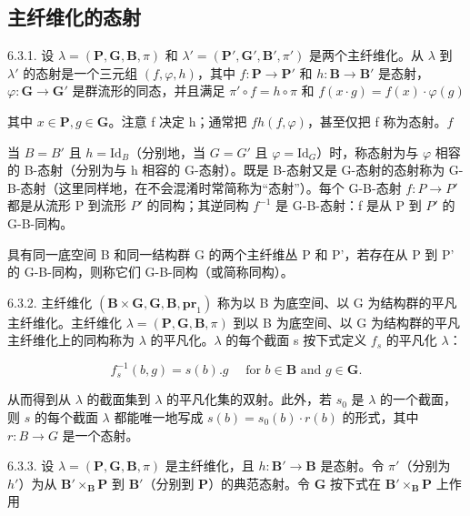 \subsection{主纤维化的态射}

6.3.1. 设 \(\lambda = (\mathbf{P}, \mathbf{G}, \mathbf{B}, \pi)\) 和 \(\lambda' = (\mathbf{P}', \mathbf{G}', \mathbf{B}', \pi')\) 是两个主纤维化。从 \(\lambda\) 到 \(\lambda'\) 的态射是一个三元组 \((f, \varphi, h)\)，其中 \(f: \mathbf{P} \to \mathbf{P}'\) 和 \(h: \mathbf{B} \to \mathbf{B}'\) 是态射，\(\varphi: \mathbf{G} \to \mathbf{G}'\) 是群流形的同态，并且满足 \(\pi' \circ f = h \circ \pi\) 和 \(f(x \cdot g) = f(x) \cdot \varphi(g)\)

其中 \(x \in \mathbf{P}, g \in \mathbf{G}\)。注意 f 决定 h；通常把 \(f\)\(h\)\((f, \varphi)\)，甚至仅把 f 称为态射。\(f\)

当 \(B = B'\) 且 \(h = \mathrm{Id}_{B}\)（分别地，当 \(G = G'\) 且 \(\varphi = \mathrm{Id}_{G}\)）时，称态射为与 \(\varphi\) 相容的 B-态射（分别为与 h 相容的 G-态射）。既是 B-态射又是 G-态射的态射称为 G-B-态射（这里同样地，在不会混淆时常简称为“态射”）。每个 G-B-态射 \(f : P \to P'\) 都是从流形 P 到流形 \(P'\) 的同构；其逆同构 \(f^{-1}\) 是 G-B-态射：f 是从 P 到 \(P'\) 的 G-B-同构。

具有同一底空间 B 和同一结构群 G 的两个主纤维丛 P 和 P'，若存在从 P 到 P' 的 G-B-同构，则称它们 G-B-同构（或简称同构）。

6.3.2. 主纤维化 \((\mathbf{B} \times \mathbf{G}, \mathbf{G}, \mathbf{B}, \mathbf{pr}_{1})\) 称为以 B 为底空间、以 G 为结构群的平凡主纤维化。主纤维化 \(\lambda = (\mathbf{P}, \mathbf{G}, \mathbf{B}, \pi)\) 到以 B 为底空间、以 G 为结构群的平凡主纤维化上的同构称为 \(\lambda\) 的平凡化。\(\lambda\) 的每个截面 s 按下式定义 \(f_{s}\) 的平凡化 \(\lambda\)：

\[
f _ {s} ^ {- 1} (b, g) = s (b). g \quad \text {   for   } b \in \mathbf {B} \text {   and   } g \in \mathbf {G}.
\]

从而得到从 \(\lambda\) 的截面集到 \(\lambda\) 的平凡化集的双射。此外，若 \(s_0\) 是 \(\lambda\) 的一个截面，则 \(s\) 的每个截面 \(\lambda\) 都能唯一地写成 \(s(b) = s_0(b) \cdot r(b)\) 的形式，其中 \(r: B \to G\) 是一个态射。

6.3.3. 设 \(\lambda = (\mathbf{P}, \mathbf{G}, \mathbf{B}, \pi)\) 是主纤维化，且 \(h: \mathbf{B}' \to \mathbf{B}\) 是态射。令 \(\pi'\)（分别为 \(h'\)）为从 \(\mathbf{B}' \times_{\mathbf{B}} \mathbf{P}\) 到 \(\mathbf{B}'\)（分别到 \(\mathbf{P}\)）的典范态射。令 \(\mathbf{G}\) 按下式在 \(\mathbf{B}' \times_{\mathbf{B}} \mathbf{P}\) 上作用

